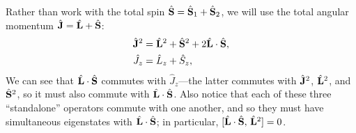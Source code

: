 \documentclass[../p116main.tex]{subfiles}
\begin{document}
Rather than work with the total spin $\hat{\mathbf{S}} = \hat{\mathbf{S}}_1 + \hat{\mathbf{S}}_2$, we will use the total angular momentum $\hat{\mathbf{J}} = \hat{\mathbf{L}} + \hat{\mathbf{S}}$:   \vspace{-10pt}
\begin{align*}
    \hat{\mathbf{J}}^2 &= \hat{\mathbf{L}}^2 + \hat{\mathbf{S}}^2 + 2 \hat{\mathbf{L}} \cdot \hat{\mathbf{S}}, \\
    \hat J_z &= \hat L_z + \hat S_z,
\end{align*}
We can see that $\hat{\mathbf{L}} \cdot \hat{\mathbf{S}}$ commutes with $\hat J_z$---the latter commutes with $\hat{\mathbf{J}}^2$, $\hat{\mathbf{L}}^2$, and $\hat{\mathbf{S}}^2$, so it must also commute with $\hat{\mathbf{L}} \cdot \hat{\mathbf{S}}$.
Also notice that each of these three ``standalone'' operators commute with one another, and so they must have simultaneous eigenstates with $\hat{\mathbf{L}} \cdot \hat{\mathbf{S}}$; in particular, $[\hat{\mathbf{L}} \cdot \hat{\mathbf{S}}, \, \hat{\mathbf{L}}^2] = 0$.
\end{document}

